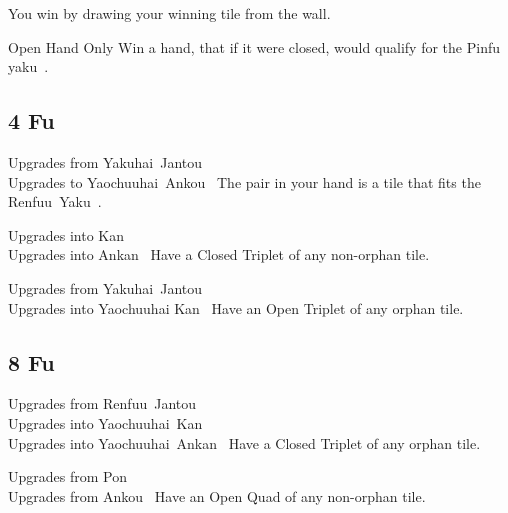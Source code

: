 	{}
	{You win by drawing your winning tile from the wall.}

	{\symbalert Open Hand Only}
	{Win a hand, that if it were closed, would qualify for the Pinfu yaku~.}


\subsection{4 Fu}\label{core:ssec:4-fu}

	{\upgradesfrom Upgrades from Yakuhai~Jantou~\\
	\upgradesto Upgrades to Yaochuuhai~Ankou~}
	{The pair in your hand is a tile that fits the Renfuu~Yaku~.}

	{\upgradesto Upgrades into Kan~\\
	\upgradesto Upgrades into Ankan~}
	{Have a Closed Triplet of any non-orphan tile.}

	{\upgradesfrom Upgrades from Yakuhai~Jantou~\\
	\upgradesto Upgrades into Yaochuuhai Kan~}
	{Have an Open Triplet of any orphan tile.}


\subsection{8 Fu}\label{core:ssec:8-fu}

	{\upgradesfrom Upgrades from Renfuu~Jantou~\\
	\upgradesto Upgrades into Yaochuuhai~Kan~\\
	\upgradesto Upgrades into Yaochuuhai~Ankan~}
	{Have a Closed Triplet of any orphan tile.}

	{\upgradesfrom Upgrades from Pon~\\
	\upgradesfrom Upgrades from Ankou~}
	{Have an Open Quad of any non-orphan tile.}


